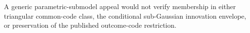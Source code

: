 A generic parametric-submodel appeal would not verify membership in either triangular common-code class, the conditional sub-Gaussian innovation envelope, or preservation of the published outcome-code restriction.
